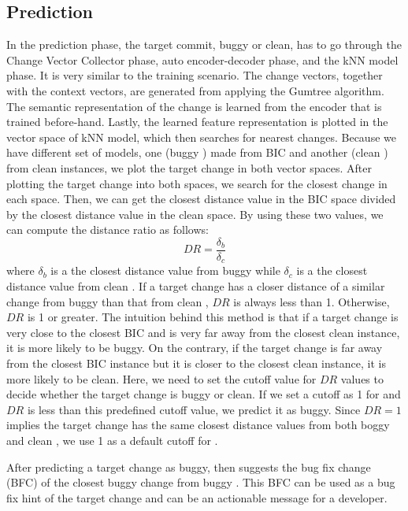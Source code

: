     \subsection{Prediction}
    In the prediction phase, the target commit, buggy or clean, has to go through the Change Vector Collector phase, auto encoder-decoder phase, and the kNN model phase. It is very similar to the training scenario.
    The change vectors, together with the context vectors, are generated from applying the Gumtree algorithm.
    The semantic representation of the change is learned from the encoder that is trained before-hand.
    Lastly, the learned feature representation is plotted in the vector space of kNN model, which then searches for nearest changes.
    Because we have different set of models, one (buggy \simfin) made from BIC and another (clean \simfin) from clean instances, we plot the target change in both vector spaces.
    After plotting the target change into both spaces, we search for the closest change in each space. Then, we can get the closest distance value in the BIC space divided by the closest distance value in the clean space. By using these two values, we can compute the distance ratio as follows:
    \begin{equation}
        DR = \frac{\delta_b}{\delta_c}
    \end{equation}
    where $\delta_b$ is a the closest distance value from buggy \simfin while $\delta_c$ is a the closest distance value from clean \simfin.
    If a target change has a closer distance of a similar change from buggy \simfin than that from clean \simfin, $DR$ is always less than 1. Otherwise, $DR$ is 1 or greater.
    The intuition behind this method is that if a target change is very close to the closest BIC and is very far away from the closest clean instance, it is more likely to be buggy.
    On the contrary, if the target change is far away from the closest BIC instance but it is closer to the closest clean instance, it is more likely to be clean. Here, we need to set the cutoff value for $DR$ values to decide whether the target change is buggy or clean.
    If we set a cutoff as 1 for \simfinmo and $DR$ is less than this predefined cutoff value, we predict it as buggy. Since $DR=1$ implies the target change has the same closest distance values from both boggy and clean \simfin, we use 1 as a default cutoff for \simfinmo.
    
    After predicting a target change as buggy, then \simfinmo suggests the bug fix change (BFC) of the closest buggy change from buggy \simfin. This BFC can be used as a bug fix hint of the target change and can be an actionable message for a developer.